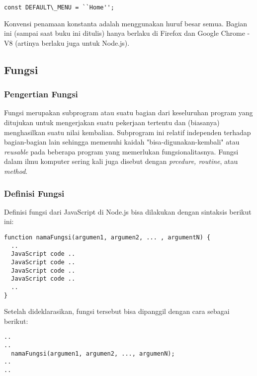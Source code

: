 \lstset{language=JavaScript,caption=Contoh konstanta dalam JavaScript}
\begin{lstlisting}
const DEFAULT\_MENU = ``Home'';
\end{lstlisting}

Konvensi penamaan konstanta adalah menggunakan huruf besar semua. Bagian ini (sampai saat buku ini ditulis) hanya berlaku di Firefox dan Google Chrome - V8 (artinya berlaku juga untuk Node.js).

\subsection{Fungsi}

\subsubsection{Pengertian Fungsi}

Fungsi merupakan subprogram atau suatu bagian dari keseluruhan program yang ditujukan untuk mengerjakan suatu pekerjaan tertentu dan (biasanya) menghasilkan suatu nilai kembalian. Subprogram ini relatif independen terhadap bagian-bagian lain sehingga memenuhi kaidah "bisa-digunakan-kembali" atau \textit{reusable} pada beberapa program yang memerlukan fungsionalitasnya. Fungsi dalam ilmu komputer sering kali juga disebut dengan \textit{prcedure, routine}, atau \textit{method}.

\subsubsection{Definisi Fungsi}

Definisi fungsi dari JavaScript di Node.js bisa dilakukan dengan sintaksis berikut ini:

\lstset{language=JavaScript,caption=Sintaksis Fungsi dalam JavaScript}
\begin{lstlisting}
function namaFungsi(argumen1, argumen2, ... , argumentN) {
  ..
  JavaScript code ..
  JavaScript code ..
  JavaScript code ..
  JavaScript code ..
  ..
}
\end{lstlisting}

Setelah dideklarasikan, fungsi tersebut bisa dipanggil dengan cara sebagai berikut:

\lstset{language=JavaScript,caption=Pemanggilan Fungsi dalam JavaScript}
\begin{lstlisting}
..
..
  namaFungsi(argumen1, argumen2, ..., argumenN);
..
..
\end{lstlisting}

